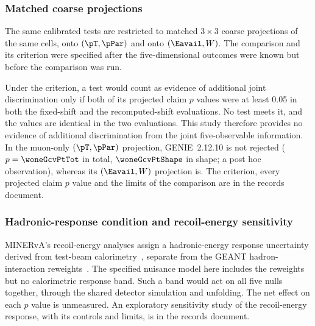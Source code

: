 \subsubsection{Matched coarse projections}
\label{sec:joint5d-projections}

The same calibrated tests are restricted to matched $3\times3$ coarse projections of the same cells, onto $(\pT,\pPar)$ and onto $(\Eavail,W)$. The comparison and its criterion were specified after the five-dimensional outcomes were known but before the comparison was run.

Under the criterion, a test would count as evidence of additional joint discrimination only if both of its projected claim $p$ values were at least 0.05 in both the fixed-shift and the recomputed-shift evaluations. No test meets it, and the values are identical in the two evaluations. This study therefore provides no evidence of additional discrimination from the joint five-observable information. In the muon-only $(\pT,\pPar)$ projection, GENIE~2.12.10 is not rejected ($p=\woneGcvPtTot$ in total, $\woneGcvPtShape$ in shape; a post hoc observation), whereas its $(\Eavail,W)$ projection is. The criterion, every projected claim $p$ value and the limits of the comparison are in the records document.


\subsubsection{Hadronic-response condition and recoil-energy sensitivity}
\label{sec:joint5d-response}

MINERvA's recoil-energy analyses assign a hadronic-energy response uncertainty derived from test-beam calorimetry~\cite{MINERvA:2015testbeam}, separate from the GEANT hadron-interaction reweights~\cite{MINERvA:2021owq,MINERvA:2022incl}. The specified nuisance model here includes the reweights but no calorimetric response band. Such a band would act on all five nulls together, through the shared detector simulation and unfolding. The net effect on each $p$ value is unmeasured. An exploratory sensitivity study of the recoil-energy response, with its controls and limits, is in the records document.


